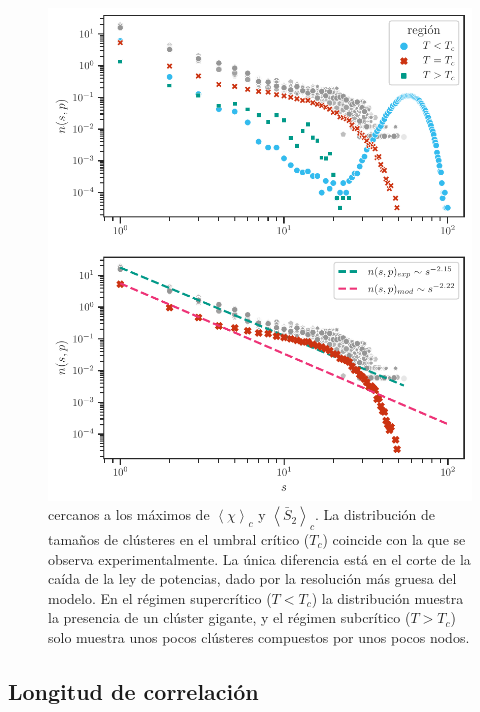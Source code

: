 \begin{figure}[h!]
	\centering\includegraphics[width=\imsize]{comparacion_modelo_experimento.pdf}
	\caption[Distribución de tamaño de clústeres  $n(s, p;)$ en función de $s$ para varios valores de $T$  de distintas regiones del diagrama de fase.  ]{cercanos  a los máximos de $\left\langle\chi\right\rangle_c$  y $\left\langle\bar{S}_2\right\rangle_c$. La distribución de tamaños de clústeres en el umbral crítico ($T_c$) coincide con la que se observa experimentalmente. La única diferencia está en el corte de la caída de la ley de potencias, dado por la resolución más gruesa del modelo. En el régimen supercrítico ($T < T_c$) la distribución muestra la presencia de un clúster gigante, y el régimen subcrítico ($T >T_c$) solo muestra unos pocos clústeres compuestos por unos pocos nodos.} \label{fig:comparacion_modelo_experimento}
\end{figure}

 \subsection{Longitud de correlación}
 

